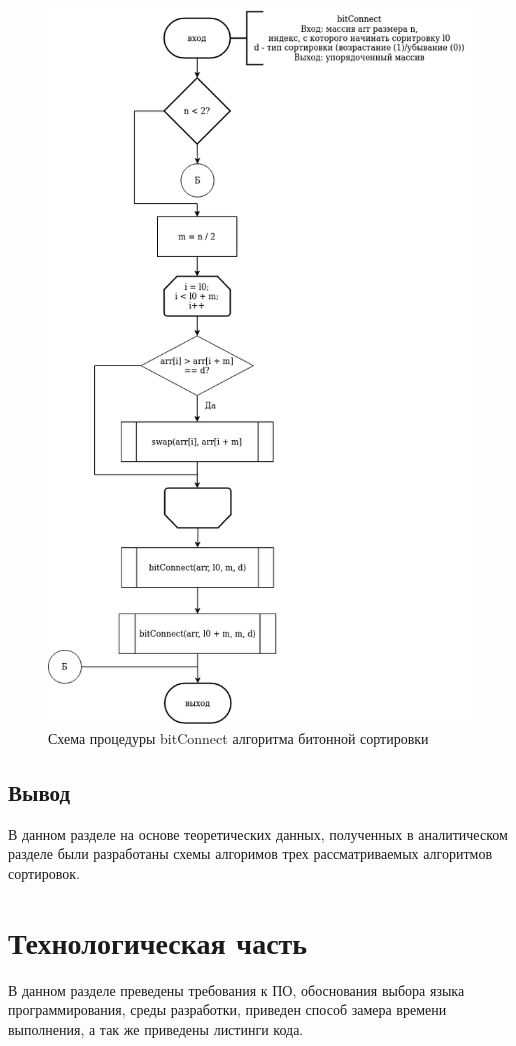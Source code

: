 \documentclass[12pt]{report}
\begin{document}
	\begin{figure}[h]
		\centering
		\includegraphics[width=0.7\linewidth]{bitonic_3}
		\caption{Схема процедуры bitConnect алгоритма битонной сортировки}
		\label{fig:schema_insertion}
	\end{figure}
	
	\section{Вывод}
	
	В данном разделе на основе теоретических данных, полученных в аналитическом разделе были разработаны схемы алгоримов трех рассматриваемых алгоритмов сортировок.
	
	\chapter{Технологическая часть}
	
	В данном разделе преведены требования к ПО, обоснования выбора языка программирования, среды разработки, приведен способ замера времени выполнения, а так же приведены листинги кода.
	
\end{document}
